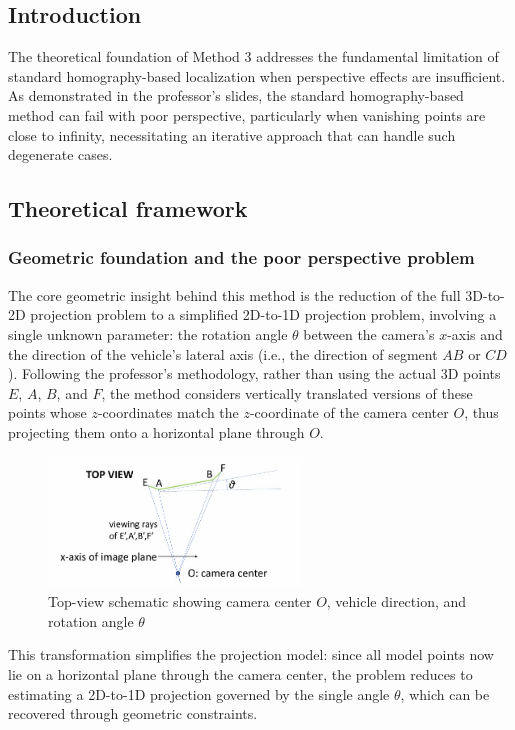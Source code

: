 \subsection{Introduction}
The theoretical foundation of Method 3 addresses the fundamental limitation of standard homography-based localization when perspective effects are insufficient. As demonstrated in the professor's slides, the standard homography-based method can fail with poor perspective, particularly when vanishing points are close to infinity, necessitating an iterative approach that can handle such degenerate cases.

\subsection{Theoretical framework}
\subsubsection{Geometric foundation and the poor perspective problem}
The core geometric insight behind this method is the reduction of the full 3D-to-2D projection problem to a simplified 2D-to-1D projection problem, involving a single unknown parameter: the rotation angle $\theta$ between the camera's $x$-axis and the direction of the vehicle's lateral axis (i.e., the direction of segment $AB$ or $CD$). Following the professor's methodology, rather than using the actual 3D points $E$, $A$, $B$, and $F$, the method considers vertically translated versions of these points whose $z$-coordinates match the $z$-coordinate of the camera center $O$, thus projecting them onto a horizontal plane through $O$.

\begin{figure}[h]
    \centering
    \includegraphics[width=0.6\textwidth]{Images/method3/schema.jpg}
    \caption{Top-view schematic showing camera center $O$, vehicle direction, and rotation angle $\theta$}
    \label{fig:theta_top_view}
\end{figure}

This transformation simplifies the projection model: since all model points now lie on a horizontal plane through the camera center, the problem reduces to estimating a 2D-to-1D projection governed by the single angle $\theta$, which can be recovered through geometric constraints.

